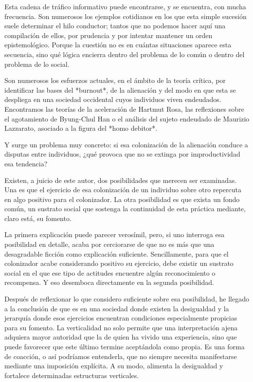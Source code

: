 \documentclass[12pt,a4paper]{article}
\begin{document}
Esta cadena de tráfico informativo puede encontrarse, y se encuentra, con mucha frecuencia. Son numerosos los ejemplos cotidianos en los que esta simple sucesión suele determinar el hilo conductor; tantos que no podemos hacer aquí una compilación de ellos, por prudencia y por intentar mantener un orden epistemológico. Porque la cuestión no es en cuántas situaciones aparece esta secuencia, sino qué lógica encierra dentro del problema de lo común o dentro del problema de lo social.

Son numerosos los esfuerzos actuales, en el ámbito de la teoría crítica, por identificar las bases del *burnout*, de la alienación y del modo en que esta se despliega en una sociedad occidental cuyos individuos viven endeudados. Encontramos las teorías de la aceleración de Hartmut Rosa, las reflexiones sobre el agotamiento de Byung-Chul Han o el análisis del sujeto endeudado de Maurizio Lazzarato, asociado a la figura del *homo debitor*.

Y surge un problema muy concreto: si esa colonización de la alienación conduce a disputas entre individuos, ¿qué provoca que no se extinga por improductividad esa tendencia?

Existen, a juicio de este autor, dos posibilidades que merecen ser examinadas. Una es que el ejercicio de esa colonización de un individuo sobre otro repercuta en algo positivo para el colonizador. La otra posibilidad es que exista un fondo común, un sustrato social que sostenga la continuidad de esta práctica mediante, claro está, su fomento.

La primera explicación puede parecer verosímil, pero, si uno interroga esa posibilidad en detalle, acaba por cerciorarse de que no es más que una desagradable ficción como explicación suficiente. Sencillamente, para que el colonizador acabe considerando positivo su ejercicio, debe existir un sustrato social en el que ese tipo de actitudes encuentre algún reconocimiento o recompensa. Y eso desemboca directamente en la segunda posibilidad.

Después de reflexionar lo que considero suficiente sobre esa posibilidad, he llegado a la conclusión de que es en una sociedad donde existen la desigualdad y la jerarquía donde esos ejercicios encuentran condiciones especialmente propicias para su fomento. La verticalidad no solo permite que una interpretación ajena adquiera mayor autoridad que la de quien ha vivido una experiencia, sino que puede favorecer que este último termine aceptándola como propia. Es una forma de coacción, o así podríamos entenderla, que no siempre necesita manifestarse mediante una imposición explícita. A su modo, alimenta la desigualdad y fortalece determinadas estructuras verticales.
\end{document}
